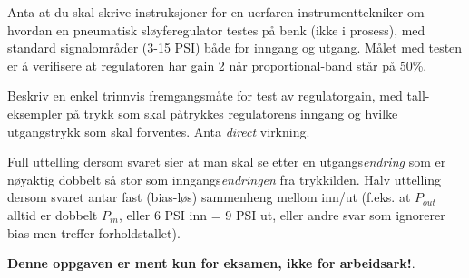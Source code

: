 

Anta at du skal skrive instruksjoner for en uerfaren instrumenttekniker om hvordan en pneumatisk sløyferegulator testes på benk (ikke i prosess), med standard signalområder (3-15 PSI) både for inngang og utgang. Målet med testen er å verifisere at regulatoren har gain 2 når proportional-band står på 50\%.

\vskip 10pt

Beskriv en enkel trinnvis fremgangsmåte for test av regulatorgain, med tall-eksempler på trykk som skal påtrykkes regulatorens inngang og hvilke utgangstrykk som skal forventes. Anta {\it direct} virkning.







Full uttelling dersom svaret sier at man skal se etter en utgangs{\it endring} som er nøyaktig dobbelt så stor som inngangs{\it endringen} fra trykkilden. Halv uttelling dersom svaret antar fast (bias-løs) sammenheng mellom inn/ut (f.eks. at $P_{out}$ alltid er dobbelt $P_{in}$, eller 6 PSI inn = 9 PSI ut, eller andre svar som ignorerer bias men treffer forholdstallet).







{\bf Denne oppgaven er ment kun for eksamen, ikke for arbeidsark!}.

